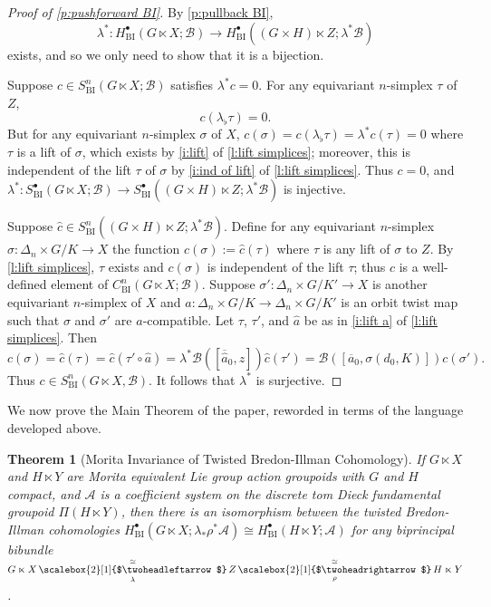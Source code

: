 \documentclass[12pt,reqno]{amsart}
\newcommand{\printname}[1]{}
\renewcommand{\printname}[1]
	{{\color{brown}{\makebox[0pt]{\hspace{-1in}\raisebox{8pt}{\tiny #1}}}}}
\newcommand{\labell}[1]{\label{#1} \printname{#1}}
\newcommand{\calA}{{\mathcal{A}}}
\newcommand{\calB}{{\mathcal{B}}}
\newcommand{\ot}[1]{{\,\underset{\raisebox{1mm}{$\scriptstyle{#1}$}}{\overset{\simeq}{\scalebox{2}[1]{$\twoheadleftarrow$}}}\,}} %
\newcommand{\subdwe}{{\,\overset{\simeq}{\scalebox{2}[1]{$\twoheadrightarrow$}}\,}} %
\theoremstyle{plain}
\newtheorem{theorem}{Theorem}[section] %
\newtheorem{theorem}{Theorem} %
\theoremstyle{definition}
\newcommand{\BI}{{\operatorname{BI}}} %
\begin{document}
    \begin{proof}[Proof of \cref{p:pushforward BI}]
        By \cref{p:pullback BI}, $$\lambda^*\colon H_\BI^\bullet(G\ltimes X;\calB)\to H_\BI^\bullet((G\times H)\ltimes Z;\lambda^*\calB)$$ exists, and so we only need to show that it is a bijection.

        Suppose $c\in S^n_\BI(G\ltimes X;\calB)$ satisfies $\lambda^*c=0$.  For any equivariant $n$-simplex $\tau$ of $Z$, $$c(\lambda_\flat\tau)=0.$$  But for any equivariant $n$-simplex $\sigma$ of $X$, $c(\sigma)=c(\lambda_\flat\tau)=\lambda^*c(\tau)=0$ where $\tau$ is a lift of $\sigma$, which exists by \cref{i:lift} of \cref{l:lift simplices}; moreover, this is independent of the lift $\tau$ of $\sigma$ by \cref{i:ind of lift} of \cref{l:lift simplices}.  Thus $c=0$, and $\lambda^*\colon S_\BI^\bullet(G\ltimes X;\calB)\to S_\BI^\bullet((G\times H)\ltimes Z;\lambda^*\calB)$ is injective.

        Suppose $\widehat{c}\in S_\BI^n((G\times H)\ltimes Z;\lambda^*\calB)$.  Define for any equivariant $n$-simplex $\sigma\colon\Delta_n\times G/K\to X$ the function $c(\sigma):=\widehat{c}(\tau)$ where $\tau$ is any lift of $\sigma$ to $Z$.  By \cref{l:lift simplices}, $\tau$ exists and $c(\sigma)$ is independent of the lift $\tau$; thus $c$ is a well-defined element of $C_\BI^n(G\ltimes X;\calB)$.  Suppose $\sigma'\colon\Delta_n\times G/K'\to X$ is another equivariant $n$-simplex of $X$ and $a\colon\Delta_n\times G/K\to\Delta_n\times G/K'$ is an orbit twist map such that $\sigma$ and $\sigma'$ are $a$-compatible. Let $\tau$, $\tau'$, and $\widehat{a}$ be as in \cref{i:lift a} of \cref{l:lift simplices}.  Then $$c(\sigma)=\widehat{c}(\tau)=\widehat{c}(\tau'\circ\widehat{a})=\lambda^*\calB\left(\left[\overline{\widehat{a}}_0,z\right]\right)\widehat{c}(\tau')=\calB\left(\left[\overline{a}_0,\sigma(d_0,K)\right]\right)c(\sigma').$$  Thus $c\in S_\BI^n(G\ltimes X,\calB)$.  It follows that $\lambda^*$ is surjective.
    \end{proof}

    We now prove the Main Theorem of the paper, reworded in terms of the language developed above.

    \begin{theorem}[Morita Invariance of Twisted Bredon-Illman Cohomology]\labell{t:bredon-illman} 
        If $G\ltimes X$ and $H\ltimes Y$ are Morita equivalent Lie group action groupoids with $G$ and $H$ compact, and $\calA$ is a coefficient system on the discrete tom Dieck fundamental groupoid $\Pi(H\ltimes Y)$, then there is an isomorphism between the twisted Bredon-Illman cohomologies $H^\bullet_\BI(G\ltimes X;\lambda_*\rho^*\calA)\cong H^\bullet_\BI(H\ltimes Y;\calA)$ for any biprincipal bibundle $G\ltimes X\ot{\lambda}Z\underset{\raisebox{1mm}{$\scriptstyle{\rho}$}}{\subdwe}H\ltimes Y$.
    \end{theorem}
\end{document}
